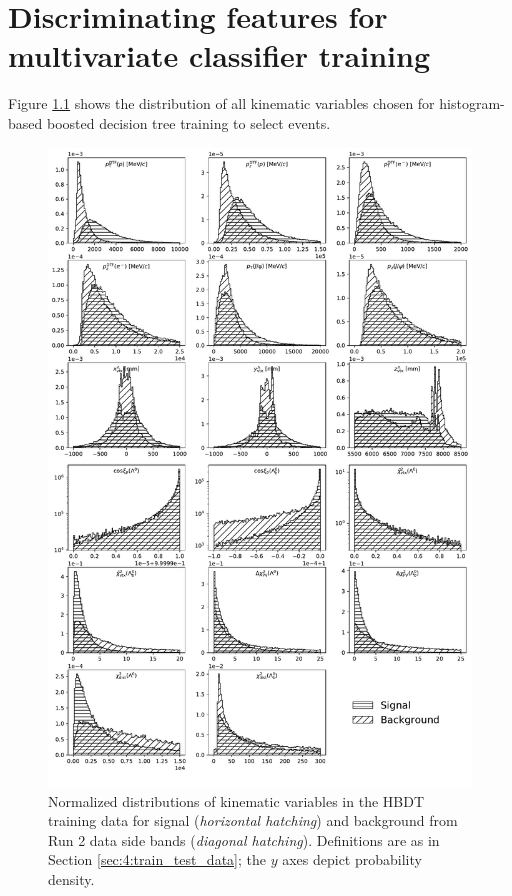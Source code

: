 \chapter{Discriminating features for multivariate classifier training}
\label{app:bdt_features}
Figure \ref{fig:B:feature_distributions} shows the distribution of all kinematic variables chosen for histogram-based boosted decision tree training to select \demonstratorfull events.

\begin{figure}
	\centering
	\includegraphics[width=.9\textwidth]{graphics/appendices/feature_distributions_balance.pdf}
	\caption{Normalized distributions of kinematic variables in the HBDT training data for signal (\textit{horizontal hatching}) and background from Run 2 data side bands (\textit{diagonal hatching}).
	Definitions are as in Section \ref{sec:4:train_test_data}; the $y$ axes depict probability density.}
	\label{fig:B:feature_distributions}
\end{figure}